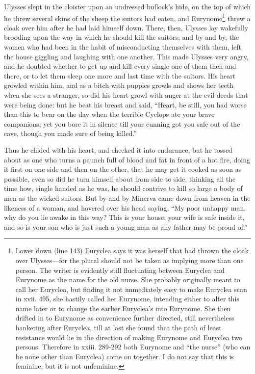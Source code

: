 Ulysses slept in the cloister upon an undressed bullock’s hide, on the top of
which he threw several skins of the sheep the suitors had eaten, and Eurynome\footnote{Lower down (line 143) Euryclea says it was herself that had thrown the cloak
over Ulysses—for the plural should not be taken as implying more than one
person. The writer is evidently still fluctuating between Euryclea and
Eurynome as the name for the old nurse. She probably originally meant to call
her Euryclea, but finding it not immediately easy to make Euryclea scan in
xvii. 495, she hastily called her Eurynome, intending either to alter this
name later or to change the earlier Euryclea’s into Eurynome. She then drifted
in to Eurynome as convenience further directed, still nevertheless hankering
after Euryclea, till at last she found that the path of least resistance would
lie in the direction of making Eurynome and Euryclea two persons. Therefore in
xxiii. 289-292 both Eurynome and “the nurse” (who can be none other than
Euryclea) come on together. I do not say that this is feminine, but it is not
unfeminine.} threw a cloak
over him after he had laid himself down. There, then, Ulysses lay wakefully
brooding upon the way in which he should kill the suitors; and by and by, the
women who had been in the habit of misconducting themselves with them, left the
house giggling and laughing with one another. This made Ulysses very angry, and
he doubted whether to get up and kill every single one of them then and there,
or to let them sleep one more and last time with the suitors. His heart growled
within him, and as a bitch with puppies growls and shows her teeth when she
sees a stranger, so did his heart growl with anger at the evil deeds that were
being done: but he beat his breast and said, “Heart, be still, you had worse
than this to bear on the day when the terrible Cyclops ate your brave
companions; yet you bore it in silence till your cunning got you safe out of
the cave, though you made sure of being killed.”

Thus he chided with his heart, and checked it into endurance, but he tossed
about as one who turns a paunch full of blood and fat in front of a hot fire,
doing it first on one side and then on the other, that he may get it cooked as
soon as possible, even so did he turn himself about from side to side, thinking
all the time how, single handed as he was, he should contrive to kill so large
a body of men as the wicked suitors. But by and by Minerva came down from
heaven in the likeness of a woman, and hovered over his head saying, “My poor
unhappy man, why do you lie awake in this way? This is your house: your wife is
safe inside it, and so is your son who is just such a young man as any father
may be proud of.”

